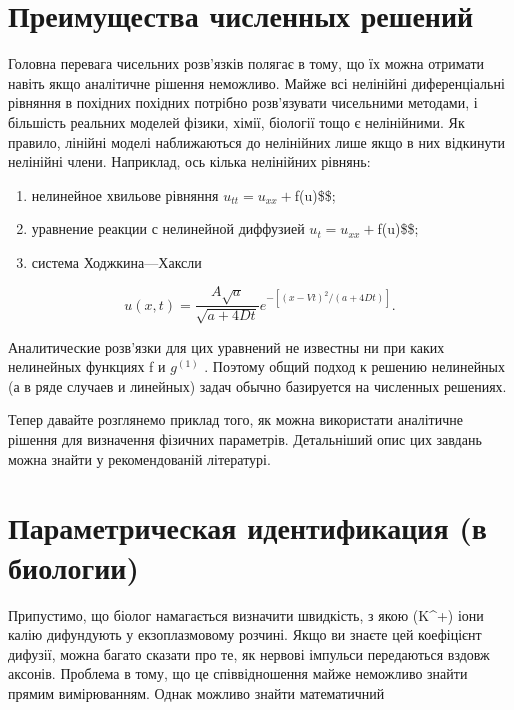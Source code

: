 \documentclass[
  ukrainian,
]{article}
\begin{document}
\section{Преимущества численных
решений}\label{ux43fux440ux435ux438ux43cux443ux449ux435ux441ux442ux432ux430-ux447ux438ux441ux43bux435ux43dux43dux44bux445-ux440ux435ux448ux435ux43dux438ux439-1}

Головна перевага чисельних розв'язків полягає в тому, що їх можна
отримати навіть якщо аналітичне рішення неможливо. Майже всі нелінійні
диференціальні рівняння в похідних похідних потрібно розв'язувати
чисельними методами, і більшість реальних моделей фізики, хімії,
біології тощо є нелінійними. Як правило, лінійні моделі наближаються до
нелінійних лише якщо в них відкинути нелінійні члени. Наприклад, ось
кілька нелінійних рівнянь:

\begin{enumerate}
\def\labelenumi{\arabic{enumi})}
\item
  нелинейное хвильове рівняння \(u_{tt} = u_{xx} +\)f(u)\$\$;
\item
  уравнение реакции с нелинейной диффузией \(u_t = u_{xx} +\)f(u)\$\$;
\item
  система Ходжкина---Хаксли
\end{enumerate}

\[
u(x, t) = \frac{A\sqrt{a}}{\sqrt{a+4Dt}}e^{-[(x-Vt)^{2}/(a+4Dt)]}.
\]

Аналитические розв'язки для цих уравнений не известны ни при каких
нелинейных функциях f и \(g^{(1)}\) . Поэтому общий подход к решению
нелинейных (а в ряде случаев и линейных) задач обычно базируется на
численных решениях.

Тепер давайте розглянемо приклад того, як можна використати аналітичне
рішення для визначення фізичних параметрів. Детальніший опис цих завдань
можна знайти у рекомендованій літературі.

\section{Параметрическая идентификация (в
биологии)}\label{ux43fux430ux440ux430ux43cux435ux442ux440ux438ux447ux435ux441ux43aux430ux44f-ux438ux434ux435ux43dux442ux438ux444ux438ux43aux430ux446ux438ux44f-ux432-ux431ux438ux43eux43bux43eux433ux438ux438}

Припустимо, що біолог намагається визначити швидкість, з якою (K\^{}+)
іони калію дифундують у екзоплазмовому розчині. Якщо ви знаєте цей
коефіцієнт дифузії, можна багато сказати про те, як нервові імпульси
передаються вздовж аксонів. Проблема в тому, що це співвідношення майже
неможливо знайти прямим вимірюванням. Однак можливо знайти математичний
\end{document}
